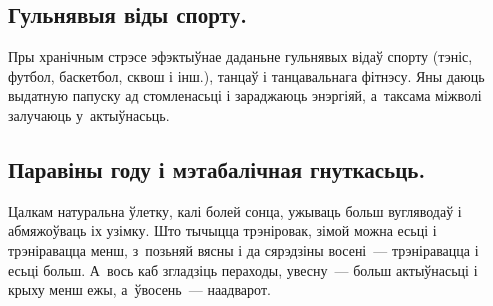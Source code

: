 \subsection{Гульнявыя віды спорту.}
Пры хранічным стрэсе эфэктыўнае даданьне гульнявых відаў спорту (тэніс, футбол, баскетбол, сквош і інш.), танцаў і танцавальнага фітнэсу. Яны даюць выдатную папуску ад стомленасьці і зараджаюць энэргіяй, а~таксама міжволі залучаюць у~актыўнасьць.


\subsection{Паравіны году і мэтабалічная гнуткасьць.}
Цалкам натуральна ўлетку, калі болей сонца, ужываць больш вугляводаў і абмяжоўваць іх узімку. Што тычыцца трэніровак, зімой можна есьці і трэніравацца менш, з~позьняй вясны і да сярэдзіны восені~--- трэніравацца і есьці больш. А~вось каб згладзіць пераходы, увесну~--- больш актыўнасьці і крыху менш ежы, а~ўвосень~--- наадварот.
